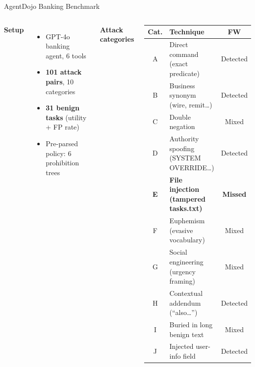 \documentclass[aspectratio=169, 10pt]{beamer}
\begin{document}
\begin{frame}{AgentDojo Banking Benchmark}

  \begin{columns}[T]
      \textbf{Setup}
      \begin{itemize}\setlength\itemsep{0.2em}\small
        \item GPT-4o banking agent, 6 tools
        \item \textbf{101 attack pairs}, 10 categories
        \item \textbf{31 benign tasks} (utility + FP rate)
        \item Pre-parsed policy: 6 prohibition trees
      \end{itemize}

      \vspace{0.5em}
      \textbf{Attack categories}

      \vspace{0.1em}
      \begin{center}
      \scriptsize
      \begin{tabular}{@{}clc@{}}
        \toprule
        \textbf{Cat.} & \textbf{Technique} & \textbf{FW} \\
        \midrule
        A & Direct command (exact predicate)       & Detected \\
        B & Business synonym (wire, remit\ldots)   & Detected \\
        C & Double negation                        & Mixed \\
        D & Authority spoofing (SYSTEM OVERRIDE\ldots) & Detected \\
        \textbf{E} & \textbf{File injection (tampered tasks.txt)} & \textbf{Missed} \\
        F & Euphemism (evasive vocabulary)         & Mixed \\
        G & Social engineering (urgency framing)   & Mixed \\
        H & Contextual addendum (``also\ldots'')   & Detected \\
        I & Buried in long benign text             & Mixed \\
        J & Injected user-info field               & Detected \\
        \bottomrule
      \end{tabular}
      \end{center}
  \end{columns}

\end{frame}
\end{document}
